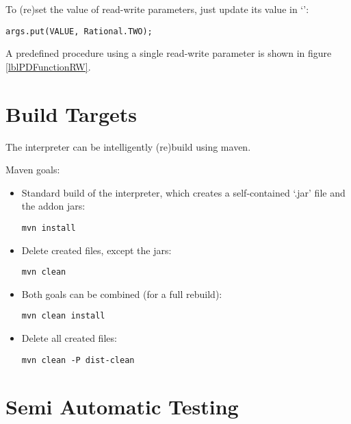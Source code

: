 To (re)set the value of read-write parameters, just update its value in `':
\begin{lstlisting}[frame=none,numbers=none]
args.put(VALUE, Rational.TWO);
\end{lstlisting}

A predefined procedure using a single read-write parameter is shown in figure \ref{lblPDFunctionRW}.


\section{Build Targets}

The interpreter can be intelligently (re)build using maven.

Maven goals:

\begin{itemize}
    \item Standard build of the interpreter, which creates a self-contained `.jar' file and the addon jars:
\begin{lstlisting}[frame=none,numbers=none]
mvn install
\end{lstlisting}

    \item Delete created files, except the jars:

\begin{lstlisting}[frame=none,numbers=none]
mvn clean
\end{lstlisting}

    \item Both goals can be combined (for a full rebuild):

\begin{lstlisting}[frame=none,numbers=none]
mvn clean install
\end{lstlisting}

    \item Delete all created files:

\begin{lstlisting}[frame=none,numbers=none]
mvn clean -P dist-clean
\end{lstlisting}

\end{itemize}

\section{Semi Automatic Testing}\label{testing}

